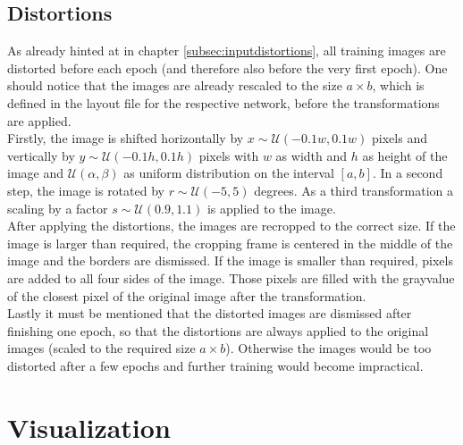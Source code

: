 \documentclass[11pt, a4paper]{article}
\newcommand\closedInt[2]{\left[#1,#2\right]}
\begin{document}
\begin{appendix}
	\subsection{Distortions}
	\label{sec:implementation-distortions}
	As already hinted at in chapter \ref{subsec:inputdistortions}, all training images are distorted before each epoch (and therefore also before the very first epoch).
	One should notice that the images are already rescaled to the size $a \times b$, which is defined in the layout file for the respective network, before the transformations are applied.\\
	Firstly, the image is shifted horizontally by $x \sim \mathcal{U}(- 0.1 w, 0.1 w)$ pixels and vertically by $y \sim \mathcal{U}(- 0.1 h, 0.1 h)$ pixels with $w$ as width and $h$ as height of the image and $\mathcal{U}(\alpha,\beta)$ as uniform distribution on the interval $\closedInt{a}{b}$. In a second step, the image is rotated by $r \sim \mathcal{U}(-5, 5)$ degrees. As a third transformation a scaling by a factor $s \sim \mathcal{U}(0.9,1.1)$ is applied to the image.\\
	After applying the distortions, the images are recropped to the correct size. If the image is larger than required, the cropping frame is centered in the middle of the image and the borders are dismissed. If the image is smaller than required, pixels are added to all four sides of the image. Those pixels are filled with the grayvalue of the closest pixel of the original image after the transformation.\\
	Lastly it must be mentioned that the distorted images are dismissed after finishing one epoch, so that the distortions are always applied to the original images (scaled to the required size $a \times b$). Otherwise the images would be too distorted after a few epochs and further training would become impractical.
	
	\section{Visualization}
\end{appendix}

{}

\end{document}
